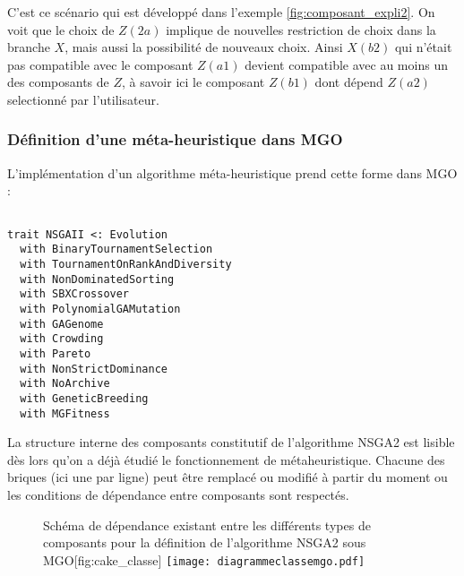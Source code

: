 C'est ce scénario qui est développé dans l'exemple \ref{fig:composant_expli2}. On voit que le choix de $Z(2a)$ implique de nouvelles restriction de choix dans la branche $X$, mais aussi la possibilité de nouveaux choix. Ainsi $X(b2)$ qui n'était pas compatible avec le composant $Z(a1)$ devient compatible avec au moins un des composants de $Z$, à savoir ici le composant $Z(b1)$ dont dépend $Z(a2)$ selectionné par l'utilisateur.


\subsubsection{Définition d'une méta-heuristique dans MGO}

L'implémentation d'un algorithme méta-heuristique prend cette forme dans MGO : 

\begin{listing}[H]

\begin{verbatim}

trait NSGAII <: Evolution
  with BinaryTournamentSelection
  with TournamentOnRankAndDiversity
  with NonDominatedSorting
  with SBXCrossover
  with PolynomialGAMutation
  with GAGenome
  with Crowding
  with Pareto
  with NonStrictDominance
  with NoArchive
  with GeneticBreeding
  with MGFitness

\end{verbatim}
\caption{Exemple de définition d'une méta-heuristique dans MGO}
\label{alg:nsga2}
\end{listing}

La structure interne des composants constitutif de l'algorithme NSGA2 est lisible dès lors qu'on a déjà étudié le fonctionnement de métaheuristique. Chacune des briques (ici une par ligne) peut être remplacé ou modifié à partir du moment ou les conditions de dépendance entre composants sont respectés. 

\begin{figure}[!htbp]
	\begin{sidecaption}[fortoc]{Schéma de dépendance existant entre les différents types de composants pour la définition de l'algorithme NSGA2 sous MGO}[fig:cake_classe]
		\centering
		\texttt{[image: diagrammeclassemgo.pdf]}{
		}
  \end{sidecaption}
\end{figure}

